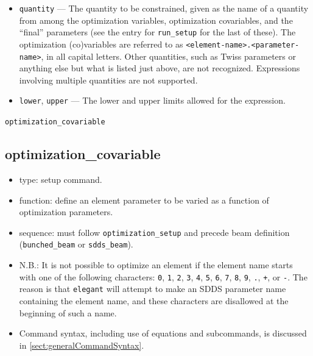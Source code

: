 \documentclass[11pt]{article}
\begin{document}
\begin{itemize}

\item \verb|quantity| --- The quantity to be constrained, given as the
name of a quantity from among the optimization variables, optimization
covariables, and the ``final'' parameters (see the entry for
\verb|run_setup| for the last of these).  The optimization
(co)variables are referred to as
\verb|<element-name>.<parameter-name>|, in all capital letters.  Other
quantities, such as Twiss parameters or anything else but what is
listed just above, are not recognized.  Expressions involving multiple
quantities are not supported.

\item \verb|lower|, \verb|upper| --- The lower and upper limits
allowed for the expression.

\end{itemize}

\newpage
\begin{center}{\Large\verb|optimization_covariable|}\end{center}
\subsection{optimization\_covariable \label{subsec:optimizationcovariable}}

\begin{itemize}
\item type: setup command.
\item function: define an element parameter to be varied as a function of optimization parameters.
\item sequence: must follow \verb|optimization_setup| and precede beam definition (\verb|bunched_beam| or \verb|sdds_beam|).
\item N.B.: It is not possible to optimize an element if the element name starts with one of the following
characters: 
\verb|0|, \verb|1|, \verb|2|, \verb|3|, \verb|4|, \verb|5|, \verb|6|, \verb|7|, \verb|8|,
\verb|9|, \verb|.|, \verb|+|, or \verb|-|.  The reason is that {\tt elegant} will attempt to 
make an SDDS parameter name containing the element name, and these characters are disallowed
at the beginning of such a name.
\item Command syntax, including use of equations and subcommands, is discussed in \ref{sect:generalCommandSyntax}.
\end{itemize}
\end{document}
